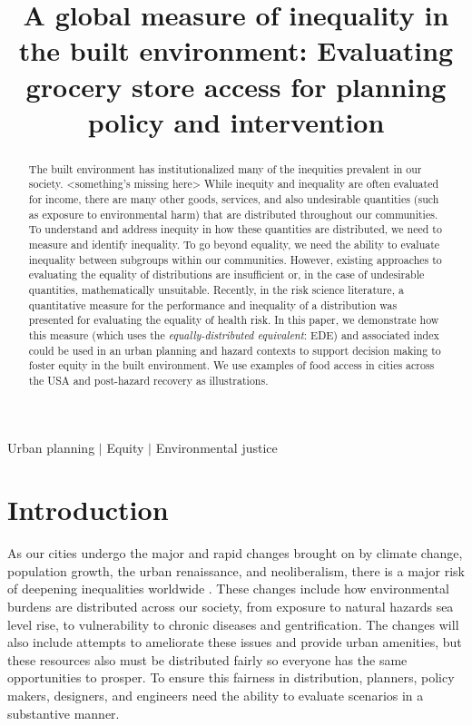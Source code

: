 \documentclass[final,3p,times,onecolumn,sort&compress]{elsarticle}
\begin{document}
\begin{frontmatter}

\title{A global measure of inequality in the built environment: Evaluating grocery store access for planning policy and intervention}



\begin{abstract}
The built environment has institutionalized many of the inequities prevalent in our society.
<something's missing here>
While inequity and inequality are often evaluated for income, there are many other goods, services, and also undesirable quantities (such as exposure to environmental harm) that are distributed throughout our communities.
To understand and address inequity in how these quantities are distributed, we need to measure and identify inequality.
To go beyond equality, we need the ability to evaluate inequality between subgroups within our communities.
However, existing approaches to evaluating the equality of distributions are insufficient or, in the case of undesirable quantities, mathematically unsuitable.
Recently, in the risk science literature, a quantitative measure for the performance and inequality of a distribution was presented for evaluating the equality of health risk.
In this paper, we demonstrate how this measure (which uses the \textit{equally-distributed equivalent}: EDE) and associated index could be used in an urban planning and hazard contexts to support decision making to foster equity in the built environment.
We use examples of food access in cities across the USA and post-hazard recovery as illustrations.
\end{abstract}

\begin{keyword}
Urban planning $|$ Equity $|$ Environmental justice 

\end{keyword}

\end{frontmatter}

\linenumbers

\section{Introduction}
As our cities undergo the major and rapid changes brought on by climate change, population growth, the urban renaissance, and neoliberalism, there is a major risk of deepening inequalities worldwide \citep{nijman}.
These changes include how environmental burdens are distributed across our society, from exposure to natural hazards sea level rise, to vulnerability to chronic diseases and gentrification. 
The changes will also include attempts to ameliorate these issues and provide urban amenities, but these resources also must be distributed fairly so everyone has the same opportunities to prosper.
To ensure this fairness in distribution, planners, policy makers, designers, and engineers need the ability to evaluate scenarios in a substantive manner.
\end{document}

